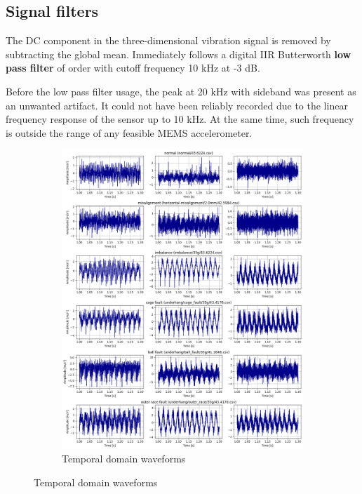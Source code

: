 \subsection{Signal filters}
The DC component in the three-dimensional vibration signal is removed by subtracting the global mean. Immediately follows a digital IIR Butterworth \textbf{low pass filter} of  order with cutoff frequency 10 kHz at -3 dB. 

Before the low pass filter usage, the peak at 20 kHz with sideband was present as an unwanted artifact. It could not have been reliably recorded due to the linear frequency response of the sensor up to 10 kHz. At the same time, such frequency is outside the range of any feasible MEMS accelerometer.

\begin{figure}[ht]
    \centering
    \begin{subfigure}[b]{0.44\textwidth}
        \includegraphics[width=\textwidth]{assets/design/Mafaulda-A-time-waveform.png}
        \caption{Temporal domain waveforms}
        \label{fig:design:fault-temporal-waveform}

\end{subfigure}
\end{figure}
